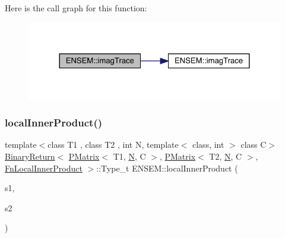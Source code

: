 Here is the call graph for this function\+:\nopagebreak
\begin{figure}[H]
\begin{center}
\leavevmode
\includegraphics[width=324pt]{df/d0a/group__primmatrix_gaa17cf25ee54da2665418c0cfbccc0ae9_cgraph}
\end{center}
\end{figure}
\mbox{\label{group__primmatrix_ga8ba784b1249c948dcff5b8fe086e2eb5}} 
\subsubsection{\texorpdfstring{localInnerProduct()}{localInnerProduct()}\hspace{0.1cm}{\footnotesize\ttfamily [1/3]}}
{\footnotesize\ttfamily template$<$class T1 , class T2 , int N, template$<$ class, int $>$ class C$>$ \\
\mbox{\hyperlink{structENSEM_1_1BinaryReturn}{Binary\+Return}}$<$ \mbox{\hyperlink{classENSEM_1_1PMatrix}{P\+Matrix}}$<$ T1, \mbox{\hyperlink{operator__name__util_8cc_a7722c8ecbb62d99aee7ce68b1752f337}{N}}, C $>$, \mbox{\hyperlink{classENSEM_1_1PMatrix}{P\+Matrix}}$<$ T2, \mbox{\hyperlink{operator__name__util_8cc_a7722c8ecbb62d99aee7ce68b1752f337}{N}}, C $>$, \mbox{\hyperlink{structENSEM_1_1FnLocalInnerProduct}{Fn\+Local\+Inner\+Product}} $>$\+::Type\+\_\+t E\+N\+S\+E\+M\+::local\+Inner\+Product (\begin{DoxyParamCaption}\item[{const \mbox{\hyperlink{classENSEM_1_1PMatrix}{P\+Matrix}}$<$ T1, \mbox{\hyperlink{operator__name__util_8cc_a7722c8ecbb62d99aee7ce68b1752f337}{N}}, C $>$ \&}]{s1,  }\item[{const \mbox{\hyperlink{classENSEM_1_1PMatrix}{P\+Matrix}}$<$ T2, \mbox{\hyperlink{operator__name__util_8cc_a7722c8ecbb62d99aee7ce68b1752f337}{N}}, C $>$ \&}]{s2 }\end{DoxyParamCaption})\hspace{0.3cm}{\ttfamily [inline]}}

